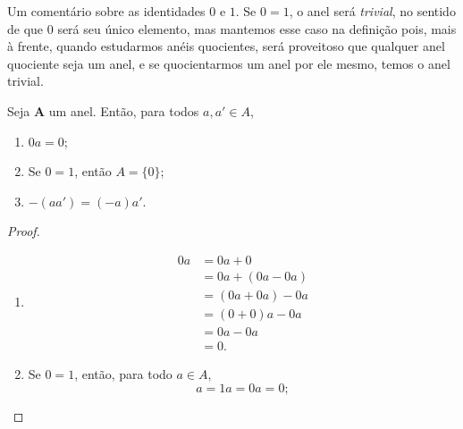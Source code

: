 Um comentário sobre as identidades $0$ e $1$. Se $0=1$, o anel será \emph{trivial}, no sentido de que $0$ será seu único elemento, mas mantemos esse caso na definição pois, mais à frente, quando estudarmos anéis quocientes, será proveitoso que qualquer anel quociente seja um anel, e se quocientarmos um anel por ele mesmo, temos o anel trivial.

\begin{prop}
Seja $\bm A$ um anel. Então, para todos $a,a' \in A$,
	\begin{enumerate}
	\item $0a = 0$;
	\item Se $0=1$, então $A=\{0\}$;
	\item $-(aa') = (-a)a'$.
	\end{enumerate}
\end{prop}
\begin{proof}
	\begin{enumerate}
	\item
		\begin{align*}
		0 a &= 0 a + 0 \\
			&= 0 a + (0 a - 0 a) \\
			&= (0 a + 0 a) - 0 a \\
			&= (0+0) a - 0 a \\
			&= 0 a - 0 a \\
			&= 0.
		\end{align*}
	
	\item Se $0=1$, então, para todo $a \in A$,
		\begin{equation*}
		a = 1a = 0a = 0;
		\end{equation*}	
	

\end{enumerate}
\end{proof}
